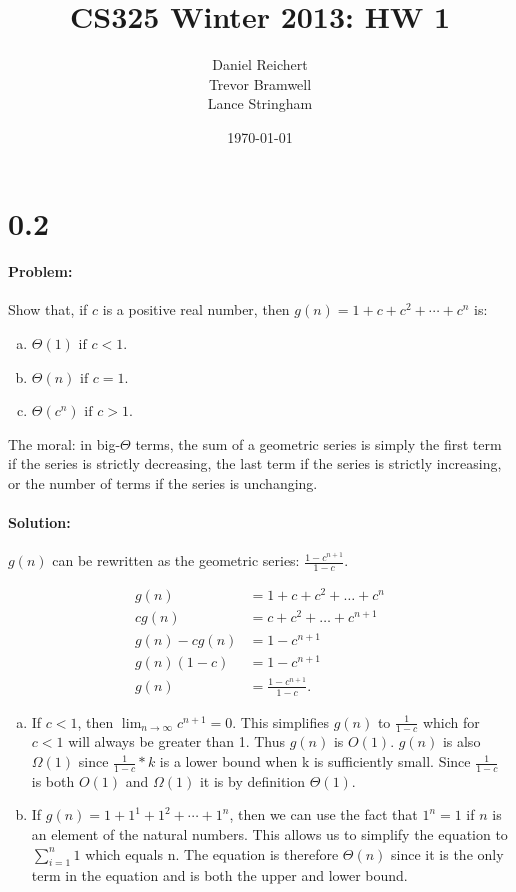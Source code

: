 \documentclass[12pt]{article}
\title{CS325 Winter 2013: HW 1}
\author{
    Daniel Reichert \\
    Trevor Bramwell \\
    Lance Stringham
}
\date{\today}
\newcommand{\BigO}[1]{\ensuremath{O(#1)}}
\begin{document}
\maketitle

\section*{0.2}
\paragraph{Problem:}
Show that, if $c$ is a positive real number, then $g(n)=1+c+c^2+\cdots+c^n$ is:

\begin{enumerate}[(a)]
\item $\Theta(1) \text{ if } c < 1$.
\item $\Theta(n) \text{ if } c = 1$.
\item $\Theta(c^n) \text{ if } c > 1$.
\end{enumerate}

The moral: in big-$\Theta$ terms, the sum of a geometric series is simply the
first term if the series is
strictly decreasing, the last term if the series is strictly increasing,
or the number of terms if the
series is unchanging.

\paragraph{Solution:}
$g(n)$ can be rewritten as the geometric series:
$\frac{1-c^{n+1}}{1-c}$. 

\begin{align*}
    g(n) &= 1 + c + c^2 + \dots + c^{n} \\
    cg(n) &= c + c^2 + \dots + c^{n+1} \\
    g(n) - cg(n) &= 1 - c^{n+1} \\
    g(n)(1 - c) &= 1 - c^{n+1} \\
    g(n) &= \frac{1 - c^{n+1}}{1 - c}.
\end{align*}

\begin{enumerate}[(a)]
\item If $c < 1$, then $\lim_{n \to \infty} c^{n+1} = 0$. This
simplifies $g(n)$ to $\frac{1}{1-c}$ which for $c < 1$ will always
be greater than 1. Thus $g(n)$ is $\BigO{1}$. $g(n)$ is also
$\Omega(1)$ since $\frac{1}{1-c}*k$ is a lower bound when k is sufficiently small.
Since $\frac{1}{1-c}$ is both $\BigO{1}$ and $\Omega(1)$ it is by
definition $\Theta(1)$.

\item If $g(n)=1+1^1+1^2+\cdots+1^n$, then we can use the fact that $1^n=1$ if $n$ is an
element of the natural numbers. This allows us to simplify the equation to
$\sum_{i=1}^n1$ which equals n. The equation is therefore $\Theta(n)$ since it is
the only term in the equation and is both the upper and lower bound.
\end{enumerate}
\end{document}
